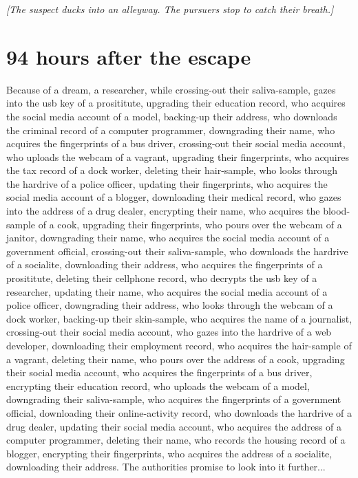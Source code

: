 \documentclass{report}
\begin{document}
\textit{[The suspect ducks into an alleyway. The pursuers stop to catch their breath.]}


\section*{94 \small{hours after the escape}}

Because of a dream, a researcher, while crossing-out their saliva-sample, gazes into the usb key of a prosititute, upgrading their education record, who acquires the social media account of a model, backing-up their address, who downloads the criminal record of a computer programmer, downgrading their name, who acquires the fingerprints of a bus driver, crossing-out their social media account, who uploads the webcam of a vagrant, upgrading their fingerprints, who acquires the tax record of a dock worker, deleting their hair-sample, who looks through the hardrive of a police officer, updating their fingerprints, who acquires the social media account of a blogger, downloading their medical record, who gazes into the address of a drug dealer, encrypting their name, who acquires the blood-sample of a cook, upgrading their fingerprints, who pours over the webcam of a janitor, downgrading their name, who acquires the social media account of a government official, crossing-out their saliva-sample, who downloads the hardrive of a socialite, downloading their address, who acquires the fingerprints of a prosititute, deleting their cellphone record, who decrypts the usb key of a researcher, updating their name, who acquires the social media account of a police officer, downgrading their address, who looks through the webcam of a dock worker, backing-up their skin-sample, who acquires the name of a journalist, crossing-out their social media account, who gazes into the hardrive of a web developer, downloading their employment record, who acquires the hair-sample of a vagrant, deleting their name, who pours over the address of a cook, upgrading their social media account, who acquires the fingerprints of a bus driver, encrypting their education record, who uploads the webcam of a model, downgrading their saliva-sample, who acquires the fingerprints of a government official, downloading their online-activity record, who downloads the hardrive of a drug dealer, updating their social media account, who acquires the address of a computer programmer, deleting their name, who records the housing record of a blogger, encrypting their fingerprints, who acquires the address of a socialite, downloading their address. The authorities promise to look into it further...
\end{document}
